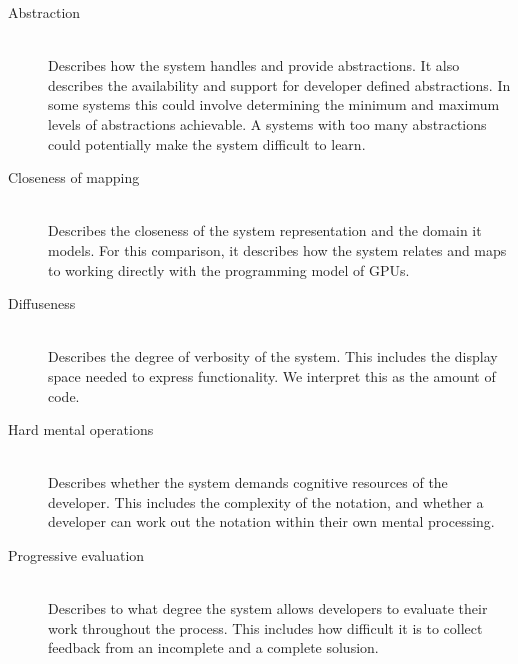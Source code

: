 \begin{description}
    \item[Abstraction]\hfill\\
    Describes how the system handles and provide abstractions. It also describes the availability and support for developer defined abstractions. In some systems this could involve determining the minimum and maximum levels of abstractions achievable. A systems with too many abstractions could potentially make the system difficult to learn.
    \item[Closeness of mapping]\hfill\\
    Describes the closeness of the system representation and the domain it models. For this comparison, it describes how the system relates and maps to working directly with the programming model of GPUs.  
    \item[Diffuseness]\hfill\\
    Describes the degree of verbosity of the system. This includes the display space needed to express functionality. We interpret this as the amount of code.
    \item[Hard mental operations]\hfill\\
    Describes whether the system demands cognitive resources of the developer. This includes the complexity of the notation, and whether a developer can work out the notation within their own mental processing.
    \item[Progressive evaluation]\hfill\\ %
    Describes to what degree the system allows developers to evaluate their work throughout the process. This includes how difficult it is to collect feedback from an incomplete and a complete solusion.
\end{description}
